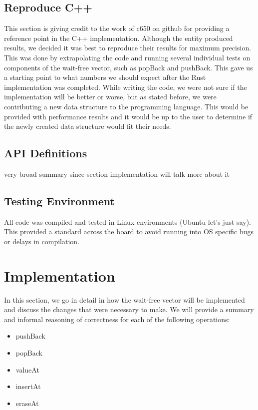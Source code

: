\documentclass[conference]{IEEEtran}
\begin{document}
    \subsection{Reproduce C++}
    
    This section is giving credit to the work of c650 on github for providing a reference point in the C++ implementation. Although the entity produced results, we decided it was best to reproduce their results for maximum precision. This was done by extrapolating the code and running several individual tests on components of the wait-free vector, such as popBack and pushBack. This gave us a starting point to what numbers we should expect after the Rust implementation was completed. While writing the code, we were not sure if the implementation will be better or worse, but as stated before, we were contributing a new data structure to the programming language. This would be provided with performance results and it would be up to the user to determine if the newly created data structure would fit their needs.

    \subsection{API Definitions}
    
    very broad summary since section {implementation} will talk more about it
    
    \subsection{Testing Environment}
    
    All code was compiled and tested in Linux environments (Ubuntu let's just say). This provided a standard across the board to avoid running into OS specific bugs or delays in compilation. 

\section{Implementation}

In this section, we go in detail in how the wait-free vector will be implemented and discuss the changes that were necessary to make. We will provide a summary and informal reasoning of correctness for each of the following operations:

    \begin{itemize}
        \item pushBack
        \item popBack
        \item valueAt
        \item insertAt
        \item eraseAt
    \end{itemize}
    
\end{document}
